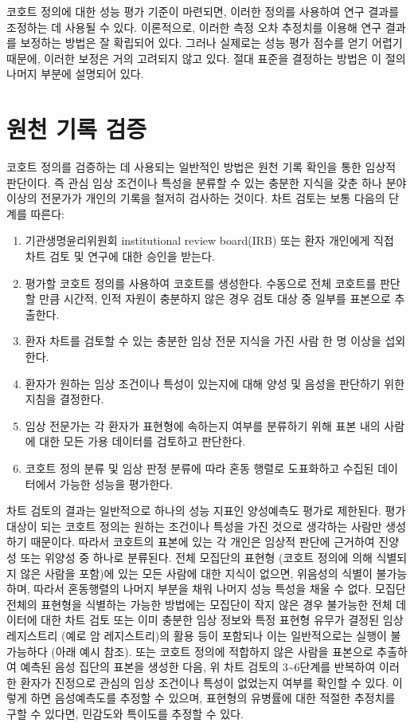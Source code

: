 \documentclass[10.5pt]{book}
\providecommand{\tightlist}{%
  \setlength{\itemsep}{0pt}\setlength{\parskip}{0pt}}
\theoremstyle{definition}
\theoremstyle{definition}
\theoremstyle{definition}
\theoremstyle{remark}
\begin{document}
코호트 정의에 대한 성능 평가 기준이 마련되면, 이러한 정의를 사용하여
연구 결과를 조정하는 데 사용될 수 있다. 이론적으로, 이러한 측정 오차
추정치를 이용해 연구 결과를 보정하는 방법은 잘 확립되어 있다. 그러나
실제로는 성능 평가 점수를 얻기 어렵기 때문에, 이러한 보정은 거의
고려되지 않고 있다. 절대 표준을 결정하는 방법은 이 절의 나머지 부분에
설명되어 있다.

\section{원천 기록 검증}\label{--}


코호트 정의를 검증하는 데 사용되는 일반적인 방법은 원천 기록 확인을 통한
임상적 판단이다. 즉 관심 임상 조건이나 특성을 분류할 수 있는 충분한
지식을 갖춘 하나 분야 이상의 전문가가 개인의 기록을 철저히 검사하는
것이다. 차트 검토는 보통 다음의 단계를 따른다:

\begin{enumerate}
\def\labelenumi{\arabic{enumi}.}
\tightlist
\item
  기관생명윤리위원회 institutional review board(IRB) 또는 환자 개인에게
  직접 차트 검토 및 연구에 대한 승인을 받는다.
\item
  평가할 코호트 정의를 사용하여 코호트를 생성한다. 수동으로 전체
  코호트를 판단할 만큼 시간적, 인적 자원이 충분하지 않은 경우 검토 대상
  중 일부를 표본으로 추출한다.
\item
  환자 차트를 검토할 수 있는 충분한 임상 전문 지식을 가진 사람 한 명
  이상을 섭외한다.
\item
  환자가 원하는 임상 조건이나 특성이 있는지에 대해 양성 및 음성을
  판단하기 위한 지침을 결정한다.
\item
  임상 전문가는 각 환자가 표현형에 속하는지 여부를 분류하기 위해 표본
  내의 사람에 대한 모든 가용 데이터를 검토하고 판단한다.
\item
  코호트 정의 분류 및 임상 판정 분류에 따라 혼동 행렬로 도표화하고
  수집된 데이터에서 가능한 성능을 평가한다.
\end{enumerate}

차트 검토의 결과는 일반적으로 하나의 성능 지표인 양성예측도 평가로
제한된다. 평가 대상이 되는 코호트 정의는 원하는 조건이나 특성을 가진
것으로 생각하는 사람만 생성하기 때문이다. 따라서 코호트의 표본에 있는 각
개인은 임상적 판단에 근거하여 진양성 또는 위양성 중 하나로 분류된다.
전체 모집단의 표현형 (코호트 정의에 의해 식별되지 않은 사람을 포함)에
있는 모든 사람에 대한 지식이 없으면, 위음성의 식별이 불가능하며, 따라서
혼동행렬의 나머지 부분을 채워 나머지 성능 특성을 채울 수 없다. 모집단
전체의 표현형을 식별하는 가능한 방법에는 모집단이 작지 않은 경우
불가능한 전체 데이터에 대한 차트 검토 또는 이미 충분한 임상 정보와 특정
표현형 유무가 결정된 임상 레지스트리 (예로 암 레지스트리)의 활용 등이
포함되나 이는 일반적으로는 실행이 불가능하다 (아래 예시 참조). 또는
코호트 정의에 적합하지 않은 사람을 표본으로 추출하여 예측된 음성 집단의
표본을 생성한 다음, 위 차트 검토의 3\textasciitilde{}6단계를 반복하여
이러한 환자가 진정으로 관심의 임상 조건이나 특성이 없었는지 여부를
확인할 수 있다. 이렇게 하면 음성예측도를 추정할 수 있으며, 표현형의
유병률에 대한 적절한 추정치를 구할 수 있다면, 민감도와 특이도를 추정할
수 있다.
\end{document}
